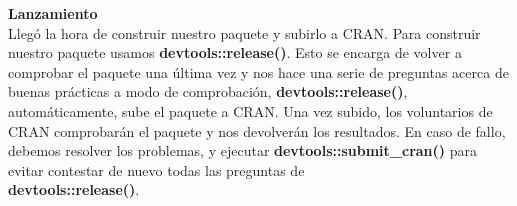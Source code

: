 \textbf{Lanzamiento}\\
Lleg\'o la hora de construir nuestro paquete y subirlo a CRAN. Para construir nuestro paquete
usamos \textbf{devtools::release()}. Esto se encarga de volver a comprobar el paquete una \'ultima
vez y nos hace una serie de preguntas acerca de buenas pr\'acticas a modo de comprobaci\'on,
\textbf{devtools::release()}, autom\'aticamente, sube el paquete a CRAN.
Una vez subido, los voluntarios de CRAN comprobar\'an el paquete y nos
devolver\'an los resultados.
En caso de fallo, debemos resolver los problemas, y ejecutar \textbf{devtools::submit\_cran()} para evitar contestar de nuevo todas las preguntas de \\
\textbf{devtools::release()}.

\newpage
